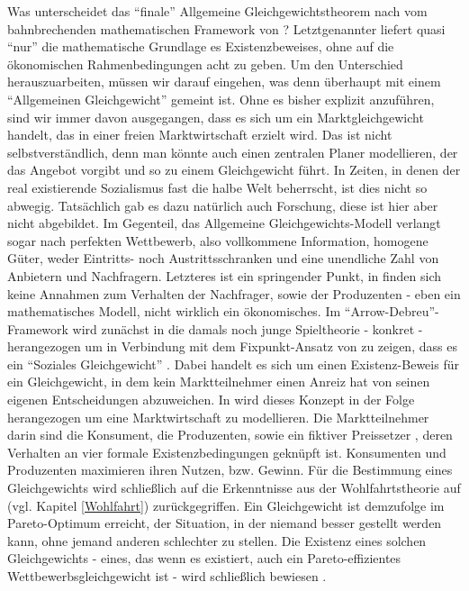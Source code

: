 Was unterscheidet das "`finale"' Allgemeine Gleichgewichtstheorem nach \textcite{Arrow1954} vom bahnbrechenden mathematischen Framework von \textcite{Neumann1937}? Letztgenannter liefert quasi "`nur"' die mathematische Grundlage es Existenzbeweises, ohne auf die ökonomischen Rahmenbedingungen acht zu geben. Um den Unterschied herauszuarbeiten, müssen wir darauf eingehen, was denn überhaupt mit einem "`Allgemeinen Gleichgewicht"' gemeint ist. Ohne es bisher explizit anzuführen, sind wir immer davon ausgegangen, dass es sich um ein Marktgleichgewicht handelt, das in einer freien Marktwirtschaft erzielt wird. Das ist nicht selbstverständlich, denn man könnte auch einen zentralen Planer modellieren, der das Angebot vorgibt und so zu einem Gleichgewicht führt. In Zeiten, in denen der real existierende Sozialismus fast die halbe Welt beherrscht, ist dies nicht so abwegig. Tatsächlich gab es dazu natürlich auch Forschung, diese ist hier aber nicht abgebildet. Im Gegenteil, das Allgemeine Gleichgewichts-Modell verlangt sogar nach perfekten Wettbewerb, also vollkommene Information, homogene Güter, weder Eintritts- noch Austrittsschranken und eine unendliche Zahl von Anbietern und Nachfragern. Letzteres ist ein springender Punkt, in \textcite{Neumann1937} finden sich keine Annahmen zum Verhalten der Nachfrager, sowie der Produzenten - eben ein mathematisches Modell, nicht wirklich ein ökonomisches. Im "`Arrow-Debreu"'-Framework wird zunächst in \textcite{Debreu1952} die damals noch junge Spieltheorie - konkret \textcite{Nash1950b} - herangezogen um in Verbindung mit dem Fixpunkt-Ansatz von \textcite{Kakutani1941} zu zeigen, dass es ein "`Soziales Gleichgewicht"' \parencite[S. 90]{Debreu1983b}. Dabei handelt es sich um einen Existenz-Beweis für ein Gleichgewicht, in dem kein Marktteilnehmer einen Anreiz hat von seinen eigenen Entscheidungen abzuweichen. In \textcite{Arrow1954} wird dieses Konzept in der Folge herangezogen um eine Marktwirtschaft zu modellieren. Die Marktteilnehmer darin sind die Konsument, die Produzenten, sowie ein fiktiver Preissetzer \parencite[S. 266]{Arrow1954}, deren Verhalten an  vier formale Existenzbedingungen geknüpft ist. Konsumenten und Produzenten maximieren ihren Nutzen, bzw. Gewinn. Für die Bestimmung eines Gleichgewichts wird schließlich auf die Erkenntnisse aus der Wohlfahrtstheorie auf (vgl. Kapitel \ref{Wohlfahrt}) zurückgegriffen. Ein Gleichgewicht ist demzufolge im Pareto-Optimum erreicht, der Situation, in der niemand besser gestellt werden kann, ohne jemand anderen schlechter zu stellen. Die Existenz eines solchen Gleichgewichts - eines, das wenn es existiert, auch ein Pareto-effizientes Wettbewerbsgleichgewicht ist -  wird schließlich bewiesen \parencite[S. 274]{Arrow1954}. 

